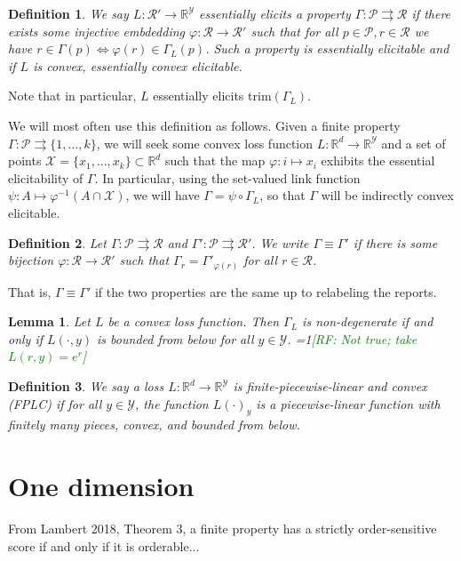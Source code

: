 \documentclass[11pt]{article}
\newcommand{\Comments}{1}
\newcommand{\mynote}[2]{\ifnum\Comments=1\textcolor{#1}{#2}\fi}
\newcommand{\raf}[1]{\mynote{green}{[RF: #1]}}
\newcommand{\reals}{\mathbb{R}}
\renewcommand{\P}{\mathcal{P}}
\newcommand{\R}{\mathcal{R}}
\newcommand{\X}{\mathcal{X}}
\newcommand{\Y}{\mathcal{Y}}
\renewcommand{\P}{\mathcal{P}}
\newcommand{\toto}{\rightrightarrows}
\newcommand{\trim}{\mathrm{trim}}
\newtheorem{lemma}{Lemma}
\newtheorem{definition}{Definition}
\begin{document}
\begin{definition}
  We say $L:\R'\to\reals^\Y$ \emph{essentially elicits} a property $\Gamma : \P \toto \R$ if there exists some injective embdedding $\varphi:\R\to\R'$ such that for all $p\in\P,r\in\R$ we have $r \in \Gamma(p) \iff \varphi(r) \in \Gamma_L(p)$.
  Such a property is \emph{essentially elicitable} and if $L$ is convex, \emph{essentially convex elicitable}.
\end{definition}
Note that in particular, $L$ essentially elicits $\trim(\Gamma_L)$.

We will most often use this definition as follows.
Given a finite property $\Gamma : \P \toto \{1,\ldots,k\}$, we will seek some convex loss function $L : \reals^d \to \reals^\Y$ and a set of points $\X=\{x_1,\ldots,x_k\} \subset \reals^d$ such that the map $\varphi:i\mapsto x_i$ exhibits the essential elicitability of $\Gamma$.
In particular, using the set-valued link function $\psi:A\mapsto \varphi^{-1}(A\cap\X)$, we will have $\Gamma = \psi \circ \Gamma_L$, so that $\Gamma$ will be indirectly convex elicitable.

\begin{definition}
  Let $\Gamma:\P\toto\R$ and $\Gamma':\P\toto\R'$.
  We write $\Gamma \equiv \Gamma'$ if there is some bijection $\varphi:\R\to\R'$ such that $\Gamma_r = \Gamma'_{\varphi(r)}$ for all $r\in\R$.
\end{definition}
That is, $\Gamma\equiv\Gamma'$ if the two properties are the same up to relabeling the reports.

\begin{lemma}
  Let $L$ be a convex loss function.
  Then $\Gamma_L$ is non-degenerate if and only if $L(\cdot,y)$ is bounded from below for all $y\in\Y$.
  \raf{Not true; take $L(r,y) = e^r$}
\end{lemma}

\begin{definition}
  We say a loss $L:\reals^d \to \reals^\Y$ is \emph{finite-piecewise-linear and convex (FPLC)} if for all $y\in\Y$, the function $L(\cdot)_y$ is a piecewise-linear function with finitely many pieces, convex, and bounded from below.
\end{definition}

\section{One dimension}

From Lambert 2018, Theorem 3, a finite property has a strictly order-sensitive score if and only if it is orderable...
\end{document}
